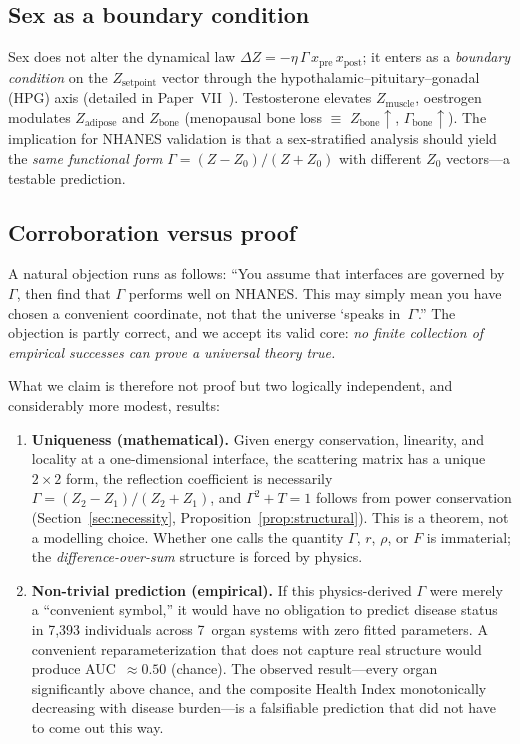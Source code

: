 \documentclass[aps,pre,twocolumn,superscriptaddress,floatfix]{revtex4-2}
\begin{document}
\subsection{Sex as a boundary condition}
\label{sec:sex-bc}

Sex does not alter the dynamical law
$\Delta Z = -\eta\,\Gamma\,x_{\text{pre}}\,x_{\text{post}}$;
it enters as a \emph{boundary condition} on the
$Z_{\text{setpoint}}$ vector through the
hypothalamic--pituitary--gonadal (HPG) axis
(detailed in Paper~VII~\cite{PaperVII}).
Testosterone elevates $Z_{\text{muscle}}$, oestrogen
modulates $Z_{\text{adipose}}$ and $Z_{\text{bone}}$
(menopausal bone loss $\equiv$ $Z_{\text{bone}}\!\uparrow$,
$\Gamma_{\text{bone}}\!\uparrow$).
The implication for NHANES validation is that a
sex-stratified analysis should yield the \emph{same
functional form} $\Gamma = (Z-Z_0)/(Z+Z_0)$ with
different $Z_0$ vectors---a testable prediction.

\subsection{Corroboration versus proof}
\label{sec:corroboration}

A natural objection runs as follows: ``You assume that
interfaces are governed by $\Gamma$, then find that $\Gamma$
performs well on NHANES.  This may simply mean you have
chosen a convenient coordinate, not that the universe
`speaks in~$\Gamma$'.''  The objection is partly correct,
and we accept its valid core:
\emph{no finite collection of empirical successes can prove
a universal theory true.}

What we claim is therefore not proof but two logically
independent, and considerably more modest, results:

\begin{enumerate}
  \item \textbf{Uniqueness (mathematical).}
    Given energy conservation, linearity, and locality at
    a one-dimensional interface, the scattering matrix
    has a unique $2\times 2$ form, the reflection
    coefficient is necessarily
    $\Gamma=(Z_2-Z_1)/(Z_2+Z_1)$, and
    $\Gamma^2+T=1$
    follows from power conservation
    (Section~\ref{sec:necessity},
    Proposition~\ref{prop:structural}).
    This is a theorem, not a modelling choice.
    Whether one calls the quantity $\Gamma$, $r$,
    $\rho$, or $F$ is immaterial;
    the \emph{difference-over-sum} structure is forced
    by physics.

  \item \textbf{Non-trivial prediction (empirical).}
    If this physics-derived $\Gamma$ were merely a
    ``convenient symbol,'' it would have no obligation
    to predict disease status in 7{,}393 individuals
    across 7~organ systems with zero fitted parameters.
    A convenient reparameterization that does not
    capture real structure would produce AUC~$\approx 0.50$
    (chance).  The observed result---every organ
    significantly above chance, and the composite Health
    Index monotonically decreasing with disease
    burden---is a falsifiable prediction that did not
    have to come out this way.
\end{enumerate}
\end{document}
